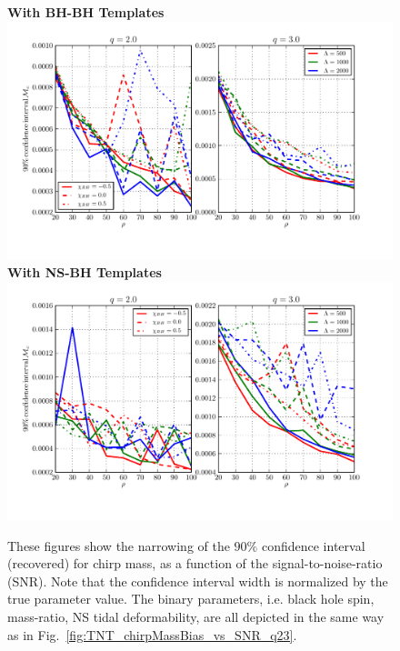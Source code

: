 \documentclass[aps,prd,amsmath,floats,floatfix, twocolumn,
superscriptaddress,nofootinbib,showpacs]{revtex4-1}
\begin{document}
% 
\begin{figure}[h]
	\centering 
	\textbf{With BH-BH Templates}
	\includegraphics[width=2\columnwidth]{plots/TN_chirpMassCIWidth90_vs_SNR_q23.pdf}\\ 
	\textbf{With NS-BH Templates}
	\includegraphics[width=2\columnwidth]{plots/TT_chirpMassCIWidth90_vs_SNR_q23.pdf}%
	\caption{These figures show the narrowing of the $90\%$ confidence 
		interval (recovered) for chirp mass, as a function of the 
		signal-to-noise-ratio (SNR). Note that the confidence interval
                width is normalized by the true parameter value.
                The binary parameters, i.e. black hole spin,
                mass-ratio, NS tidal deformability, are all depicted in the 
                same way as in Fig.~\ref{fig:TNT_chirpMassBias_vs_SNR_q23}.
	}
	\label{fig:TNT_chirpMassCIWidth90_vs_SNR_q23}
\end{figure}
% 
\end{document}
